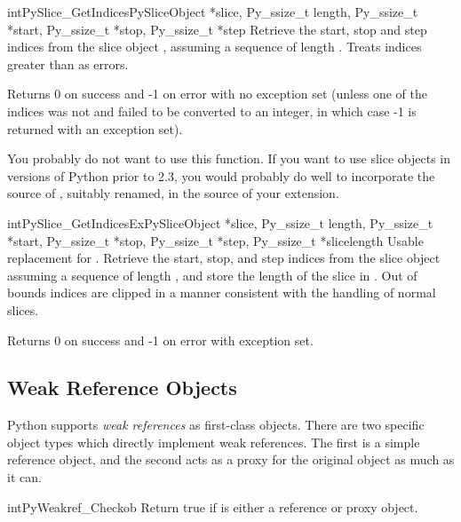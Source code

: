 \begin{cfuncdesc}{int}{PySlice_GetIndices}{PySliceObject *slice, Py_ssize_t length,
                                           Py_ssize_t *start, Py_ssize_t *stop, Py_ssize_t *step}
Retrieve the start, stop and step indices from the slice object
, assuming a sequence of length . Treats
indices greater than  as errors.

Returns 0 on success and -1 on error with no exception set (unless one
of the indices was not  and failed to be converted to
an integer, in which case -1 is returned with an exception set).

You probably do not want to use this function.  If you want to use
slice objects in versions of Python prior to 2.3, you would probably
do well to incorporate the source of ,
suitably renamed, in the source of your extension.
\end{cfuncdesc}

\begin{cfuncdesc}{int}{PySlice_GetIndicesEx}{PySliceObject *slice, Py_ssize_t length,
                                             Py_ssize_t *start, Py_ssize_t *stop, Py_ssize_t *step,
                                             Py_ssize_t *slicelength}
Usable replacement for .  Retrieve the
start, stop, and step indices from the slice object 
assuming a sequence of length , and store the length of
the slice in .  Out of bounds indices are clipped in
a manner consistent with the handling of normal slices.

Returns 0 on success and -1 on error with exception set.

\end{cfuncdesc}


\subsection{Weak Reference Objects \label{weakref-objects}}

Python supports \emph{weak references} as first-class objects.  There
are two specific object types which directly implement weak
references.  The first is a simple reference object, and the second
acts as a proxy for the original object as much as it can.

\begin{cfuncdesc}{int}{PyWeakref_Check}{ob}
  Return true if  is either a reference or proxy object.
\end{cfuncdesc}

